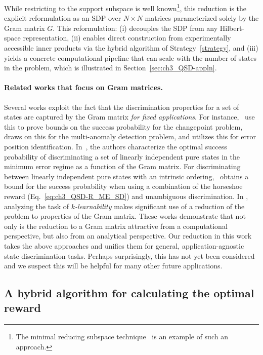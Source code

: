 While restricting to the support subspace is well known\footnote{The minimal reducing subspace technique~\cite[Proposition 1]{holevo1982testing} is an example of such an approach.}, this reduction is the explicit reformulation as an SDP over $N \times N$ matrices parameterized solely by the Gram matrix $G$. 
This reformulation:
(i) decouples the SDP from any Hilbert-space representation, 
(ii) enables direct construction from experimentally accessible inner products via the hybrid algorithm of Strategy~\ref{strategy}, and 
(iii) yields a concrete computational pipeline that can scale with the number of states in the problem, which is illustrated in Section~\ref{sec:ch3_QSD-appln}.

\paragraph{Related works that focus on Gram matrices.}
Several works exploit the fact that the discrimination properties for a set of states are captured by the Gram matrix \emph{for fixed applications}. 
For instance,~\cite{sentis2016quantum, sentis2017exact, sentis2018online} use this to prove bounds on the success probability for the changepoint problem,~\cite{llorens2024quantum} draws on this for the multi-anomaly detection problem, and \cite{skotiniotis2018identification} utilizes this for error position identification. 
In~\cite{dalla2015optimality}, the authors characterize the optimal success probability of discriminating a set of linearly independent pure states in the minimum error regime as a function of the Gram matrix.
For discriminating between linearly independent pure states with an intrinsic ordering,~\cite{martinez2019certified} obtains a bound for the success probability when using a combination of the horseshoe reward (Eq.~\eqref{eq:ch3_QSD-R_ME_SD}) and unambiguous discrimination. 
In \cite{johnston2023tight, johnston2025complexityperfectquantumstate}, analyzing the task of \emph{$k$-learnability} makes significant use of a reduction of the problem to properties of the Gram matrix. 
These works demonstrate that not only is the reduction to a Gram matrix attractive from a computational perspective, but also from an analytical perspective. 
Our reduction in this work takes the above approaches and unifies them for general, application-agnostic state discrimination tasks. 
Perhaps surprisingly, this has not yet been considered and we suspect this will be helpful for many other future applications.

\subsection{A hybrid algorithm for calculating the optimal reward}

